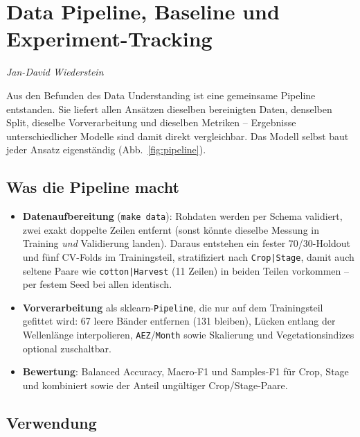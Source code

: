 
\section{Data Pipeline, Baseline und Experiment-Tracking}
\label{sec:pipeline}
{\small\textit{Jan-David Wiederstein}}

Aus den Befunden des Data Understanding ist eine gemeinsame Pipeline entstanden. Sie liefert
allen Ansätzen dieselben bereinigten Daten, denselben Split, dieselbe Vorverarbeitung und
dieselben Metriken -- Ergebnisse unterschiedlicher Modelle sind damit direkt vergleichbar.
Das Modell selbst baut jeder Ansatz eigenständig (Abb.~\ref{fig:pipeline}).

\subsection*{Was die Pipeline macht}

\begin{itemize}
  \item \textbf{Datenaufbereitung} (\texttt{make data}): Rohdaten werden per Schema validiert,
        zwei exakt doppelte Zeilen entfernt (sonst könnte dieselbe Messung in Training
        \emph{und} Validierung landen). Daraus entstehen ein fester 70/30-Holdout und fünf
        CV-Folds im Trainingsteil, stratifiziert nach \texttt{Crop|Stage}, damit auch seltene
        Paare wie \texttt{cotton|Harvest} (11 Zeilen) in beiden Teilen vorkommen -- per festem
        Seed bei allen identisch.
  \item \textbf{Vorverarbeitung} als sklearn-\texttt{Pipeline}, die nur auf dem Trainingsteil
        gefittet wird: 67 leere Bänder entfernen (131 bleiben), Lücken entlang der Wellenlänge
        interpolieren, \texttt{AEZ}/\texttt{Month} sowie Skalierung und Vegetationsindizes
        optional zuschaltbar.
  \item \textbf{Bewertung}: Balanced Accuracy, Macro-F1 und Samples-F1 für Crop, Stage und
        kombiniert sowie der Anteil ungültiger Crop/Stage-Paare.
\end{itemize}

\subsection*{Verwendung}


